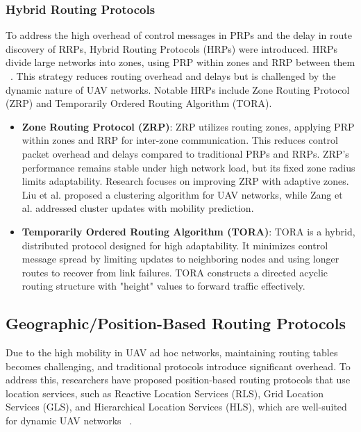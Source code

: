 \subsubsection{Hybrid Routing Protocols}

To address the high overhead of control messages in PRPs and the delay in route discovery of RRPs, Hybrid Routing Protocols (HRPs) were introduced. HRPs divide large networks into zones, using PRP within zones and RRP between them ~\cite{Chen2020}. This strategy reduces routing overhead and delays but is challenged by the dynamic nature of UAV networks. Notable HRPs include Zone Routing Protocol (ZRP) and Temporarily Ordered Routing Algorithm (TORA).

\begin{itemize}
    \item \textbf{Zone Routing Protocol (ZRP)}: ZRP utilizes routing zones, applying PRP within zones and RRP for inter-zone communication. This reduces control packet overhead and delays compared to traditional PRPs and RRPs. ZRP's performance remains stable under high network load, but its fixed zone radius limits adaptability. Research focuses on improving ZRP with adaptive zones. Liu et al. proposed a clustering algorithm for UAV networks, while Zang et al. addressed cluster updates with mobility prediction.
    
    \item \textbf{Temporarily Ordered Routing Algorithm (TORA)}: TORA is a hybrid, distributed protocol designed for high adaptability. It minimizes control message spread by limiting updates to neighboring nodes and using longer routes to recover from link failures. TORA constructs a directed acyclic routing structure with "height" values to forward traffic effectively.
\end{itemize}


\subsection{Geographic/Position-Based Routing Protocols}

Due to the high mobility in UAV ad hoc networks, maintaining routing tables becomes challenging, and traditional protocols introduce significant overhead. To address this, researchers have proposed position-based routing protocols that use location services, such as Reactive Location Services (RLS), Grid Location Services (GLS), and Hierarchical Location Services (HLS), which are well-suited for dynamic UAV networks ~\cite{Chen2020}.

